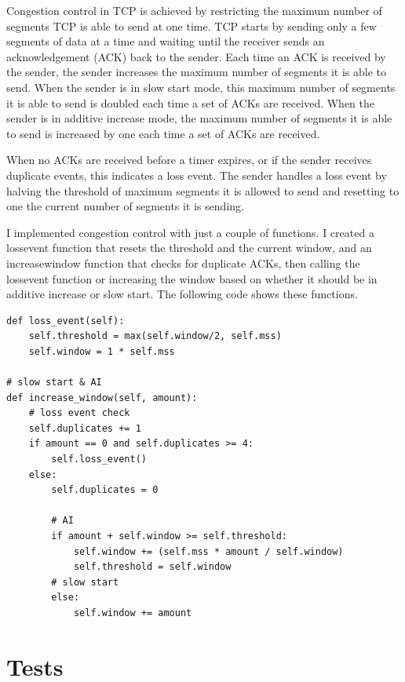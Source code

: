 \documentclass[11pt]{article}
\begin{document}
Congestion control in TCP is achieved by restricting the maximum number of segments TCP is able to send at one time. TCP starts by sending only a few segments of data at a time and waiting until the receiver sends an acknowledgement (ACK) back to the sender. Each time an ACK is received by the sender, the sender increases the maximum number of segments it is able to send. When the sender is in slow start mode, this maximum number of segments it is able to send is doubled each time a set of ACKs are received. When the sender is in additive increase mode, the maximum number of segments it is able to send is increased by one each time a set of ACKs are received.

When no ACKs are received before a timer expires, or if the sender receives duplicate events, this indicates a loss event. The sender handles a loss event by halving the threshold of maximum segments it is allowed to send and resetting to one the current number of segments it is sending.

I implemented congestion control with just a couple of functions. I created a lossevent function that resets the threshold and the current window, and an increasewindow function that checks for duplicate ACKs, then calling the lossevent function or increasing the window based on whether it should be in additive increase or slow start. The following code shows these functions.

\vspace{5mm}
\begin{absolutelynopagebreak}
\begin{lstlisting}
def loss_event(self):
    self.threshold = max(self.window/2, self.mss)
    self.window = 1 * self.mss

# slow start & AI
def increase_window(self, amount):
    # loss event check
    self.duplicates += 1
    if amount == 0 and self.duplicates >= 4:
        self.loss_event()
    else:
        self.duplicates = 0

        # AI
        if amount + self.window >= self.threshold:
            self.window += (self.mss * amount / self.window)
            self.threshold = self.window
        # slow start
        else:
            self.window += amount
\end{lstlisting}
\end{absolutelynopagebreak}
\vspace{5mm}

\section{Tests}
\end{document}
